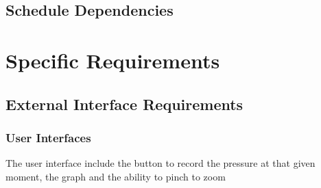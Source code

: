 \documentclass[onecolumn, draftclsnofoot,10pt, compsoc]{IEEEtran}
\def \CapstoneProjectName{ISS Barometer App }
\begin{document}
\subsection{Schedule Dependencies}
%
%
%
%
%
%

\section{Specific Requirements}

\subsection{External Interface Requirements}

\subsubsection{User Interfaces}
The user interface include the button to record the pressure at that given moment, the graph and the ability to pinch to zoom
\end{document}
